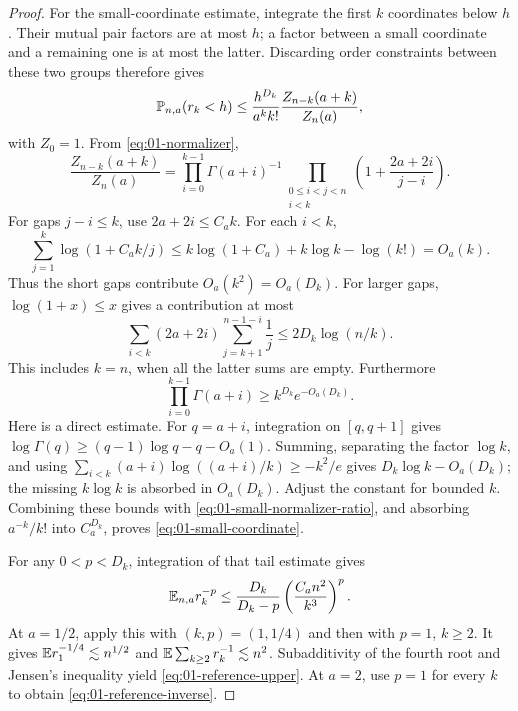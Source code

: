 \begin{proof}
For the small-coordinate estimate, integrate the first $k$
coordinates below $h$. Their mutual pair factors are at most $h$;
a factor between a small coordinate and a remaining one is at most
the latter. Discarding order constraints between these two groups
therefore gives
\begin{equation}\label{eq:01-small-normalizer-ratio}
 \mathbb P_{n,a}(r_k<h)
 \le\frac{h^{D_k}}{a^k k!}\frac{Z_{n-k}(a+k)}{Z_n(a)},
\end{equation}
with $Z_0=1$. From \eqref{eq:01-normalizer},
\[
 \frac{Z_{n-k}(a+k)}{Z_n(a)}
 =\prod_{i=0}^{k-1}\Gamma(a+i)^{-1}
  \prod_{\substack{0\le i<j<n\\i<k}}
       \left(1+\frac{2a+2i}{j-i}\right).
\]
For gaps $j-i\le k$, use $2a+2i\le C_a k$. For each $i<k$,
\[
 \sum_{j=1}^k\log(1+C_a k/j)
 \le k\log(1+C_a)+k\log k-\log(k!)=O_a(k).
\]
Thus the short gaps contribute $O_a(k^2)=O_a(D_k)$. For larger
gaps, $\log(1+x)\le x$ gives a contribution at most
\[
 \sum_{i<k}(2a+2i)\sum_{j=k+1}^{n-1-i}\frac1j
 \le 2D_k\log(n/k).
\]
This includes $k=n$, when all the latter sums are empty.
Furthermore
\begin{equation}\label{eq:01-gamma-product}
 \prod_{i=0}^{k-1}\Gamma(a+i)\ge k^{D_k}e^{-O_a(D_k)}.
\end{equation}
Here is a direct estimate. For $q=a+i$, integration on $[q,q+1]$
gives
$\log\Gamma(q)\ge(q-1)\log q-q-O_a(1)$.
Summing, separating the factor $\log k$, and using
$\sum_{i<k}(a+i)\log((a+i)/k)\ge-k^2/e$ gives
$D_k\log k-O_a(D_k)$; the missing $k\log k$ is absorbed in
$O_a(D_k)$. Adjust the constant for bounded $k$.
Combining these bounds with
\eqref{eq:01-small-normalizer-ratio}, and absorbing $a^{-k}/k!$
into $C_a^{D_k}$, proves \eqref{eq:01-small-coordinate}.

For any $0<p<D_k$, integration of that tail estimate gives
\begin{equation}\label{eq:01-inverse-tail}
 \mathbb E_{n,a}r_k^{-p}
 \le\frac{D_k}{D_k-p}
       \left(\frac{C_a n^2}{k^3}\right)^p.
\end{equation}
At $a=1/2$, apply this with $(k,p)=(1,1/4)$ and then with $p=1$,
$k\ge2$. It gives
$\mathbb E r_1^{-1/4}\lesssim n^{1/2}$ and
$\mathbb E\sum_{k\ge2}r_k^{-1}\lesssim n^2$.
Subadditivity of the fourth root and Jensen's inequality yield
\eqref{eq:01-reference-upper}. At $a=2$, use $p=1$ for every $k$
to obtain \eqref{eq:01-reference-inverse}.


\end{proof}
